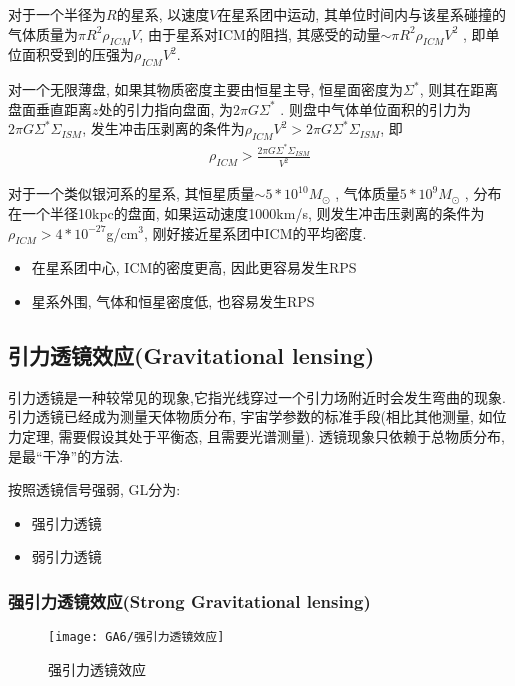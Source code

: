 对于一个半径为$R$的星系, 以速度$V$在星系团中运动, 其单位时间内与该星系碰撞的气体质量为$\pi R^2 \rho_{ICM}V$, 由于星系对ICM的阻挡, 其感受的动量$\sim \pi R^2\rho_{ICM}V^2$ , 即单位面积受到的压强为$\rho_{ICM}V^2$. 

对一个无限薄盘, 如果其物质密度主要由恒星主导, 恒星面密度为$\Sigma^*$,  则其在距离盘面垂直距离$z$处的引力指向盘面, 为$2\pi G\Sigma^*$ . 则盘中气体单位面积的引力为$2\pi G \Sigma^* \Sigma_{ISM}$, 发生冲击压剥离的条件为$\rho_{ICM}V^2>2\pi G\Sigma^* \Sigma_{ISM}$, 即
\begin{align*}
    \rho_{ICM}>\frac{2\pi G \Sigma^* \Sigma_{ISM}}{V^2}
\end{align*}

对于一个类似银河系的星系, 其恒星质量$\sim 5*10^{10} M_{\odot}$ , 气体质量$5*10^9 M_{\odot}$ ,  分布在一个半径10kpc的盘面, 如果运动速度1000km/s, 则发生冲击压剥离的条件为$\rho_{ICM}>4*10^{-27}$g/cm${}^3$, 刚好接近星系团中ICM的平均密度. 

\begin{itemize}\small
    \item 在星系团中心, ICM的密度更高, 因此更容易发生RPS
    \item 星系外围, 气体和恒星密度低, 也容易发生RPS    
\end{itemize}

\subsection{引力透镜效应(Gravitational lensing)}
引力透镜是一种较常见的现象,它指光线穿过一个引力场附近时会发生弯曲的现象. 引力透镜已经成为测量天体物质分布, 宇宙学参数的标准手段(相比其他测量, 如位力定理, 需要假设其处于平衡态, 且需要光谱测量). 透镜现象只依赖于总物质分布, 是最``干净''的方法. 

按照透镜信号强弱, GL分为: 
\begin{itemize}
    \item 强引力透镜
    \item 弱引力透镜
\end{itemize}

\subsubsection{强引力透镜效应(Strong Gravitational lensing)}

\begin{figure}[!htb]
    \centering
    \texttt{[image: GA6/强引力透镜效应]}
    \caption{强引力透镜效应}
\end{figure}

